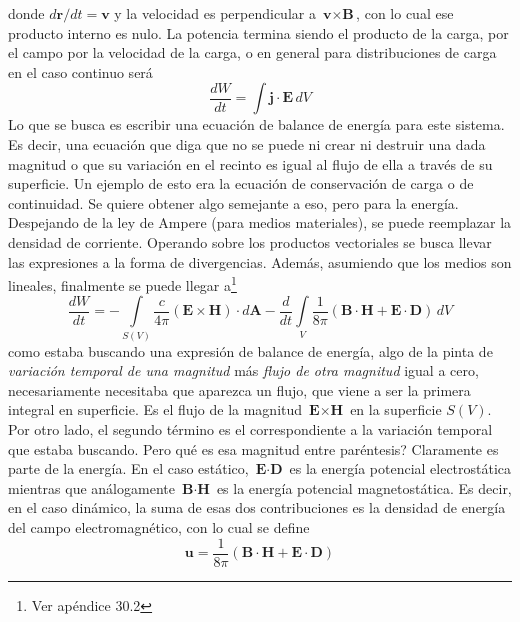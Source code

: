 donde $d\textbf{r}/dt = \textbf{v}$ y la velocidad es perpendicular a $\textbf{v}\times \textbf{B}$, con lo cual ese producto interno es nulo. La potencia termina siendo el producto de la carga, por el campo por la velocidad de la carga, o en general para distribuciones de carga en el caso continuo será
\begin{equation}
    \frac{dW}{dt} = \int \textbf{j}\cdot \textbf{E}\,dV
        \label{ec:dW/dt-1}
\end{equation}
Lo que se busca es escribir una ecuación de balance de energía para este sistema. Es decir, una ecuación que diga que no se puede ni crear ni destruir una dada magnitud o que su variación en el recinto es igual al flujo de ella a través de su superficie. Un ejemplo de esto era la ecuación de conservación de carga o de continuidad. Se quiere obtener algo semejante a eso, pero para la energía. \\
\indent Despejando de la ley de Ampere (para medios materiales), se puede reemplazar la densidad de corriente. Operando sobre los productos vectoriales se busca llevar las expresiones a la forma de divergencias. Además, asumiendo que los medios son lineales, finalmente se puede llegar a\footnote{Ver apéndice 30.2}
\begin{equation}
    \frac{dW}{dt} 
    = -\int\limits_{S(V)}
    \frac{c}{4\pi}
    \left(
        \textbf{E}\times\textbf{H}
    \right)\cdot d\textbf{A}
    -
    \frac{d}{dt}
    \int\limits_{V}
    \frac{1}{8\pi}
    \left(
        \textbf{B}\cdot\textbf{H} + \textbf{E}\cdot \textbf{D}
    \right)\,dV
        \label{ec:dW/dt-2}
\end{equation}
como estaba buscando una expresión de balance de energía, algo de la pinta de \textit{variación temporal de una magnitud} más \textit{flujo de otra magnitud} igual a cero, necesariamente necesitaba que aparezca un flujo, que viene a ser la primera integral en superficie. Es el flujo de la magnitud $\textbf{E}\times \textbf{H}$ en la superficie $S(V)$. Por otro lado, el segundo término es el correspondiente a la variación temporal que estaba buscando. Pero qué es esa magnitud entre paréntesis? Claramente es parte de la energía. En el caso estático, $\textbf{E}\cdot \textbf{D}$ es la energía potencial electrostática mientras que análogamente $\textbf{B}\cdot\textbf{H}$ es la energía potencial magnetostática. Es decir, en el caso dinámico, la suma de esas dos contribuciones es la densidad de energía del campo electromagnético, con lo cual se define
\begin{equation}
    \textbf{u} = \frac{1}{8\pi}
    \left(
        \textbf{B}\cdot\textbf{H} + \textbf{E}\cdot \textbf{D}
    \right)
        \label{ec:DensidadEnergiaEM}
\end{equation}
